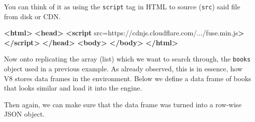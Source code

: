 \documentclass[
]{krantz}
\makeatletter
\newenvironment{Shaded}{\begin{snugshade}}{\end{snugshade}}
\newcommand{\CommentTok}[1]{\textcolor[rgb]{0.37,0.37,0.37}{\textit{#1}}}
\newcommand{\DataTypeTok}[1]{\textcolor[rgb]{0.27,0.27,0.27}{#1}}
\newcommand{\KeywordTok}[1]{\textcolor[rgb]{0.27,0.27,0.27}{\textbf{#1}}}
\newcommand{\NormalTok}[1]{#1}
\newcommand{\OperatorTok}[1]{\textcolor[rgb]{0.43,0.43,0.43}{\textbf{#1}}}
\newcommand{\OtherTok}[1]{\textcolor[rgb]{0.37,0.37,0.37}{#1}}
\newcommand{\StringTok}[1]{\textcolor[rgb]{0.5,0.5,0.5}{#1}}
\newenvironment{kframe}{%
\medskip{}
\setlength{\fboxsep}{.8em}
 \def\at@end@of@kframe{}%
 \ifinner\ifhmode%
  \def\at@end@of@kframe{\end{minipage}}%
  \begin{minipage}{\columnwidth}%
 \fi\fi%
 \def\FrameCommand##1{\hskip\@totalleftmargin \hskip-\fboxsep
 \colorbox{shadecolor}{##1}\hskip-\fboxsep
     \hskip-\linewidth \hskip-\@totalleftmargin \hskip\columnwidth}%
 \MakeFramed {\advance\hsize-\width
   \@totalleftmargin\z@ \linewidth\hsize
   \@setminipage}}%
 {\par\unskip\endMakeFramed%
 \at@end@of@kframe}
\renewenvironment{Shaded}{\begin{kframe}}{\end{kframe}}
\makeatother
\begin{document}
You can think of it as using the \texttt{script} tag in HTML to source (\texttt{src}) said file from disk or CDN.

\begin{Shaded}
\begin{Highlighting}[]
\KeywordTok{<html>}
  \KeywordTok{<head>}
    \KeywordTok{<script} 
\OtherTok{      src=}\StringTok{\textquotesingle{}https://cdnjs.cloudflare.com/.../fuse.min.js\textquotesingle{}}\KeywordTok{>}
    \KeywordTok{</script>}
  \KeywordTok{</head>}
  \KeywordTok{<body>}
  \KeywordTok{</body>}
\KeywordTok{</html>}
\end{Highlighting}
\end{Shaded}

Now onto replicating the array (list) which we want to search through, the \texttt{books} object used in a previous example. As already observed, this is in essence, how V8 stores data frames in the environment. Below we define a data frame of books that looks similar and load it into the engine.

\begin{Shaded}
\end{Shaded}

Then again, we can make sure that the data frame was turned into a row-wise JSON object.

\begin{Shaded}
\end{Shaded}
\end{document}
